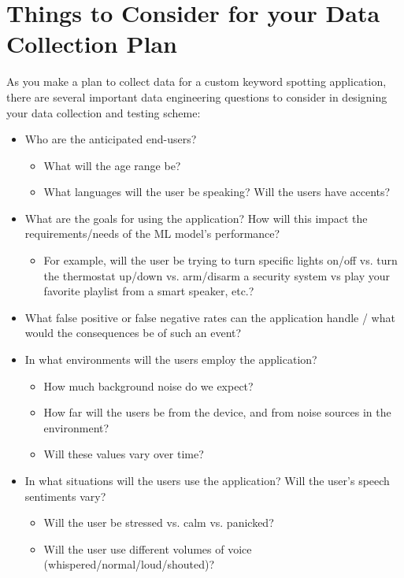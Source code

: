 \section{Things to Consider for your Data Collection Plan}

    As you make a plan to collect data for a custom keyword spotting application, there are several important data engineering questions to consider in designing your data collection and testing scheme:
    
\begin{itemize}
  \item Who are the anticipated end-users?
    \begin{itemize}
      \item What will the age range be?
      \item What languages will the user be speaking? Will the users have accents?
    \end{itemize}    
  \item What are the goals for using the application? How will this impact the requirements/needs of the ML model's performance?
    \begin{itemize}
      \item For example, will the user be trying to turn specific lights on/off vs. turn the thermostat up/down vs. arm/disarm a security system vs play your favorite playlist from a smart speaker, etc.?
    \end{itemize}    
  \item  What false positive or false negative rates can the application handle / what would the consequences be of such an event?
  \item In what environments will the users employ the application?
    \begin{itemize}
      \item How much background noise do we expect?
      \item How far will the users be from the device, and from noise sources in the environment?
      \item Will these values vary over time?
    \end{itemize}    
  \item    In what situations will the users use the application? Will the user’s speech sentiments vary?
    \begin{itemize}
      \item Will the user be stressed vs. calm vs. panicked?
      \item Will the user use different volumes of voice (whispered/normal/loud/shouted)?

\end{itemize}
\end{itemize}
